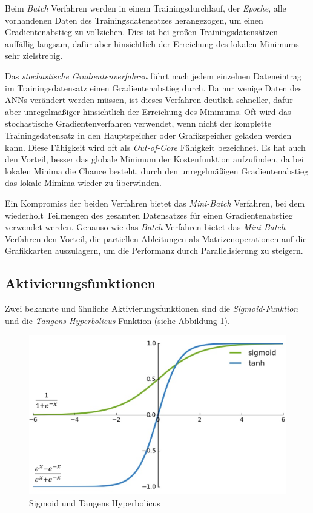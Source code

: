 Beim \textit{Batch} Verfahren werden in einem Trainingsdurchlauf, der \textit{Epoche}, alle vorhandenen Daten des Trainingsdatensatzes herangezogen, um einen Gradientenabstieg zu vollziehen. Dies ist bei großen Trainingsdatensätzen auffällig langsam, dafür aber hinsichtlich der Erreichung des lokalen Minimums sehr zielstrebig. \cite{AurelienGeron.2018}

Das \textit{stochastische Gradientenverfahren} führt nach jedem einzelnen Dateneintrag im Trainingsdatensatz einen Gradientenabstieg durch. Da nur wenige Daten des ANNs verändert werden müssen, ist dieses Verfahren deutlich schneller, dafür aber unregelmäßiger hinsichtlich der Erreichung des Minimums. Oft wird das stochastische Gradientenverfahren verwendet, wenn nicht der komplette Trainingsdatensatz in den Hauptspeicher oder Grafikspeicher geladen werden kann. Diese Fähigkeit wird oft als \textit{Out-of-Core} Fähigkeit bezeichnet. Es hat auch den Vorteil, besser das globale Minimum der Kostenfunktion aufzufinden, da bei lokalen Minima die Chance besteht, durch den unregelmäßigen Gradientenabstieg das lokale Mimima wieder zu überwinden. \cite{AurelienGeron.2018}

Ein Kompromiss der beiden Verfahren bietet das \textit{Mini-Batch} Verfahren, bei dem wiederholt Teilmengen des gesamten Datensatzes für einen Gradientenabstieg verwendet werden. Genauso wie das \textit{Batch} Verfahren bietet das \textit{Mini-Batch} Verfahren den Vorteil, die partiellen Ableitungen als Matrizenoperationen auf die Grafikkarten auszulagern, um die Performanz durch Parallelisierung zu steigern. \cite{AurelienGeron.2018}

\subsection*{Aktivierungsfunktionen}

Zwei bekannte und ähnliche Aktivierungsfunktionen sind die \textit{Sigmoid-Funktion} und die \textit{Tangens Hyperbolicus} Funktion (siehe Abbildung \ref{sigmoid}).

\begin{figure}[ht]
	\begin{center}
		\includegraphics[width=15cm]{Bilder/sigmoid.png} 
		\caption[Sigmoid und Tangens Hyperbolicus]{Sigmoid und Tangens Hyperbolicus \cite{RonnyRestrepo.20170816}}
		\label{sigmoid}
	\end{center}
\end{figure}

